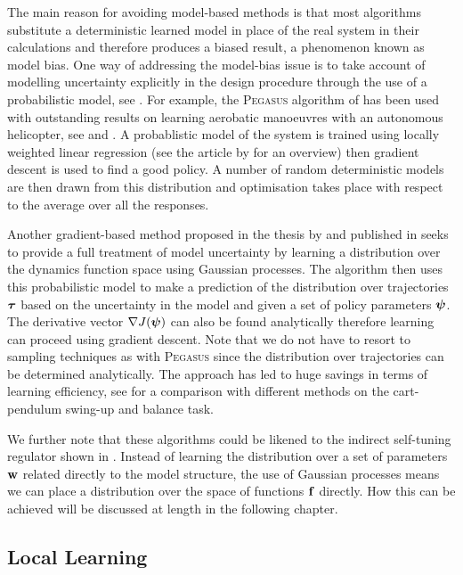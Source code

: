 The main reason for avoiding model-based methods is that most algorithms substitute a deterministic learned model in place of the real system in their calculations and therefore produces a biased result, a phenomenon known as model bias. 
One way of addressing the model-bias issue is to take account of modelling uncertainty explicitly in the design procedure through the use of a probabilistic model, see . For example, the \textsc{Pegasus} algorithm of \cite{NJ00} has been used with outstanding results on learning aerobatic manoeuvres with an autonomous helicopter, see \cite{NKJS04} and \cite{NCDG04}. A probablistic model of the system is trained using locally weighted linear regression (see the article by \cite{TVS10} for an overview) then gradient descent is used to find a good policy. A number of random deterministic models are then drawn from this distribution and optimisation takes place with respect to the average over all the responses.

Another gradient-based method proposed in the thesis by \cite{Dei09} and published in \cite{DR11} seeks to provide a full treatment of model uncertainty by learning a distribution over the dynamics function space using Gaussian processes. The algorithm then uses this probabilistic model to make a prediction of the distribution over trajectories $\boldsymbol{\tau}$ based on the uncertainty in the model and given a set of policy parameters $\boldsymbol{\psi}$. The derivative vector $\nabla J(\boldsymbol{\psi})$ can also be found analytically therefore learning can proceed using gradient descent. Note that we do not have to resort to sampling techniques as with \textsc{Pegasus} since the distribution over trajectories can be determined analytically. The approach has led to huge savings in terms of learning efficiency, see \cite{DR11} for a comparison with different methods on the cart-pendulum swing-up and balance task.

We further note that these algorithms could be likened to the indirect self-tuning regulator shown in . Instead of learning the distribution over a set of parameters $\mathbf{w}$ related directly to the model structure, the use of Gaussian processes means we can place a distribution over the space of functions $\mathbf{f}$ directly. How this can be achieved will be discussed at length in the following chapter.









\subsection{Local Learning} %



